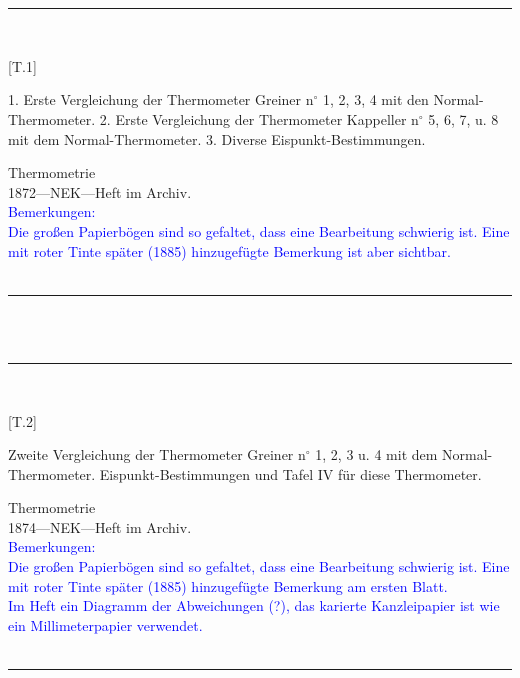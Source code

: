 \\
\vspace*{-2.5pt}\\
\parbox{\textwidth}{%
\rule{\textwidth}{1pt}\vspace*{-3mm}\\
\begin{minipage}[t]{0.2\textwidth}\vspace{0pt}
\Huge\rule[-4mm]{0cm}{1cm}[T.1]
\end{minipage}
\hfill
\begin{minipage}[t]{0.8\textwidth}\vspace{0pt}
\large 1. Erste Vergleichung der Thermometer Greiner n{$^\circ$} 1, 2, 3, 4 mit den Normal-Thermometer. 2. Erste Vergleichung der Thermometer Kappeller n{$^\circ$} 5, 6, 7, u. 8 mit dem Normal-Thermometer. 3. Diverse Eispunkt-Bestimmungen.\rule[-2mm]{0mm}{2mm}
\end{minipage}
{\footnotesize\flushright
Thermometrie\\
}
1872\quad---\quad NEK\quad---\quad Heft im Archiv.\\
\textcolor{blue}{Bemerkungen:\\{}
Die großen Papierbögen sind so gefaltet, dass eine Bearbeitung schwierig ist. Eine mit roter Tinte später (1885) hinzugefügte Bemerkung ist aber sichtbar.\\{}
}
\\[-15pt]
\rule{\textwidth}{1pt}
}
\\
\vspace*{-2.5pt}\\
\parbox{\textwidth}{%
\rule{\textwidth}{1pt}\vspace*{-3mm}\\
\begin{minipage}[t]{0.2\textwidth}\vspace{0pt}
\Huge\rule[-4mm]{0cm}{1cm}[T.2]
\end{minipage}
\hfill
\begin{minipage}[t]{0.8\textwidth}\vspace{0pt}
\large Zweite Vergleichung der Thermometer Greiner n{$^\circ$} 1, 2, 3 u. 4 mit dem Normal-Thermometer.  Eispunkt-Bestimmungen und Tafel IV für diese Thermometer.\rule[-2mm]{0mm}{2mm}
\end{minipage}
{\footnotesize\flushright
Thermometrie\\
}
1874\quad---\quad NEK\quad---\quad Heft im Archiv.\\
\textcolor{blue}{Bemerkungen:\\{}
Die großen Papierbögen sind so gefaltet, dass eine Bearbeitung schwierig ist. Eine mit roter Tinte später (1885) hinzugefügte Bemerkung am ersten Blatt.\\{}
Im Heft ein Diagramm der Abweichungen (?), das karierte Kanzleipapier ist wie ein Millimeterpapier verwendet.\\{}
}
\\[-15pt]
\rule{\textwidth}{1pt}
}
